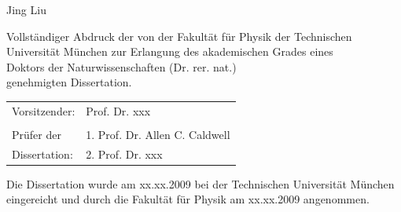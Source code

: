 \begin{titlepage}
\Large Jing Liu

\vspace{2. cm}

\normalsize Vollst\"andiger Abdruck der von der Fakult\"at f\"ur
Physik der Technischen Universit\"at M\"unchen zur Erlangung des
akademischen Grades eines \\
Doktors der Naturwissenschaften (Dr. rer. nat.) \\
genehmigten Dissertation. \\

\vspace{1.5 cm} 

\begin{table}[h]
  \centering
  \begin{tabular}{ll}
    Vorsitzender: & Prof. Dr. xxx\\ 
    & \\ 
    Pr\"ufer der & 1. Prof. Dr. Allen C. Caldwell\\ 
    Dissertation: & 2. Prof. Dr. xxx \\ 
  \end{tabular}
\end{table}

\vspace{2.0 cm} 

Die Dissertation wurde am xx.xx.2009 bei der Technischen Universit\"at
M\"unchen eingereicht und durch die Fakult\"at f\"ur Physik am
xx.xx.2009 angenommen. \\

\end{titlepage} 

\cleardoublepage

